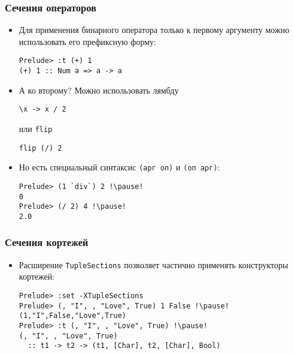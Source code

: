 \documentclass[10pt]{beamer}
\begin{document}
\begin{frame}[fragile]
\frametitle{Сечения операторов}
\begin{itemize}
    \item Для применения бинарного оператора только к первому аргументу можно использовать его префиксную форму:
\begin{lstlisting}
Prelude> :t (+) 1
(+) 1 :: Num a => a -> a
\end{lstlisting}\pause
    \item А ко второму? Можно использовать лямбду
\begin{lstlisting}
\x -> x / 2
\end{lstlisting}
или \lstinline|flip|
\begin{lstlisting}
flip (/) 2
\end{lstlisting}\pause
    \item Но есть специальный синтаксис \lstinline|(арг оп)| и \lstinline|(оп арг)|:
\begin{lstlisting}
Prelude> (1 `div`) 2 !\pause!
0
Prelude> (/ 2) 4 !\pause!
2.0
\end{lstlisting}
\end{itemize}
\end{frame}

\begin{frame}[fragile]
\frametitle{Сечения кортежей}
\begin{itemize}
    \item Расширение \lstinline|TupleSections| позволяет частично применять конструкторы кортежей:
\begin{lstlisting}
Prelude> :set -XTupleSections
Prelude> (, "I", , "Love", True) 1 False !\pause!
(1,"I",False,"Love",True)
Prelude> :t (, "I", , "Love", True) !\pause!
(, "I", , "Love", True)
  :: t1 -> t2 -> (t1, [Char], t2, [Char], Bool)
\end{lstlisting}
\end{itemize}
\end{frame}
\end{document}
